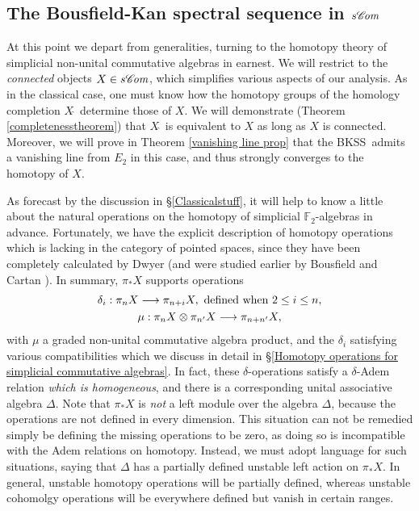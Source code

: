 \documentclass[11pt]{amsart} \renewcommand{\baselinestretch}{1.2}
\theoremstyle{plain}
\numberwithin{equation}{section} %
\theoremstyle{plain}
\numberwithin{equation}{chapter} %
\renewcommand{\to}{\longrightarrow}
\newcommand{\scrC}{\mathscr{C}}
\newcommand{\calX}{\mathcal{X}}
\newcommand{\calc}{\mathcal{C}}
\newcommand{\F}{\mathbb{F}}
\newcommand{\algs}{{\scrC\!\textit{\normalfont\textit{om}}}}
\newcommand{\Ftwo}{\F_2}
\newcommand{\E}[5]{[E^{#1}_{#2}#3]^{#4}_{#5}}
\newcommand{\BKSS}{BKSS}
\newcommand{\SubsectionOrSection}[1]{\subsection{#1}}
\begin{document}
\begin{Introduction}
\SubsectionOrSection{The Bousfield-Kan spectral sequence in $s\algs$}
\label{The BKSS intro spiel}
At this point we depart from generalities, turning to the homotopy theory of simplicial non-unital commutative algebras in earnest.
We will restrict to the \emph{connected} objects $X\in s\algs$, which simplifies various aspects of our analysis.
As in the classical case, one must know how the homotopy groups of the homology completion $X\hat{\ }$ determine those of $X$. We will demonstrate (Theorem \ref{completenesstheorem}) that $X\hat{\ }$ is equivalent to $X$ as long as $X$ is connected. Moreover, we will prove in Theorem \ref{vanishing line prop} that the \BKSS\ admits a vanishing line from $E_2 $ in this case, and thus strongly converges to the homotopy of $X$.

As forecast by the discussion in \S\ref{Classicalstuff}, it will help to know a little about the natural operations on the homotopy of simplicial $\Ftwo$-algebras in advance. Fortunately, we have 
the explicit description of homotopy operations which is lacking in the category of pointed spaces, since they have been completely calculated by Dwyer \cite{DwyerHtpyOpsSimpComAlg.pdf} (and were studied earlier by Bousfield \cite{BousOpnsDerFun.pdf,BousHomogFunctors.pdf} and Cartan \cite{CartanDivSquares}). In summary, $\pi_*X$ supports operations
\begin{gather*}
\delta_i:\pi_nX\to \pi_{n+i}X,\textup{ defined when }2\leq i\leq n,\\
\mu:\pi_nX\otimes \pi_{n'}X\to \pi_{n+n'}X,
\end{gather*}
with $\mu$ a graded non-unital commutative algebra product, and %
the $\delta_i$ satisfying various compatibilities which we discuss in detail in \S\ref{Homotopy operations for simplicial commutative algebras}. In fact, these $\delta$-operations satisfy a $\delta$-Adem relation \emph{which is homogeneous}, and there is a corresponding unital associative algebra $\Delta$. Note that $\pi_*X$ is \emph{not} a left module over the algebra $\Delta$, because the operations are not defined in every dimension. This situation can not be remedied simply be defining the missing operations to be zero, as doing so is incompatible with the Adem relations on homotopy. Instead, we must adopt language for such situations, saying that $\Delta$ has a partially defined unstable left action on $\pi_*X$. In general, unstable homotopy operations will be  partially defined, whereas unstable cohomolgy operations will be everywhere defined but vanish in certain ranges.


\end{Introduction}
\end{document}
